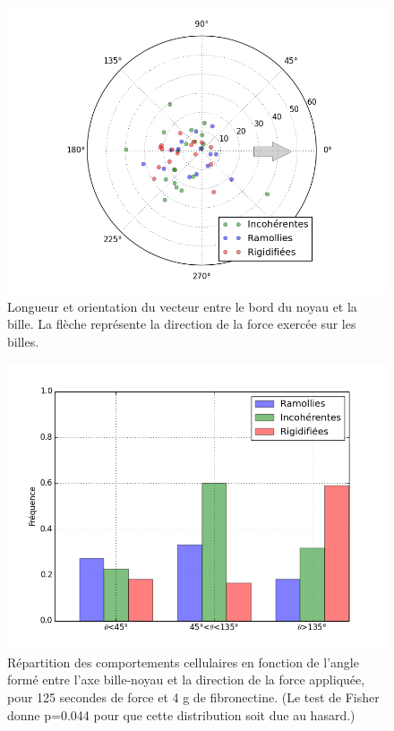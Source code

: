 \begin{figure}
\includegraphics[scale=0.45]{Figures/Positions_FRI.png} 
\caption{Longueur et orientation du vecteur entre le bord du noyau et la bille. La flèche représente la direction de la force exercée sur les billes.\label{polar}}
\end{figure}
\begin{figure}[p]
\includegraphics[scale=0.45]{Figures/Hist_Angles.png} 
\caption{Répartition des comportements cellulaires en fonction de l'angle formé entre l'axe bille-noyau et la direction de la force appliquée, pour 125 secondes de force et 4 \micro g de fibronectine. (Le test de Fisher donne p=0.044 pour que cette distribution soit due au hasard.) \label{Angle_C4}}
\end{figure}

